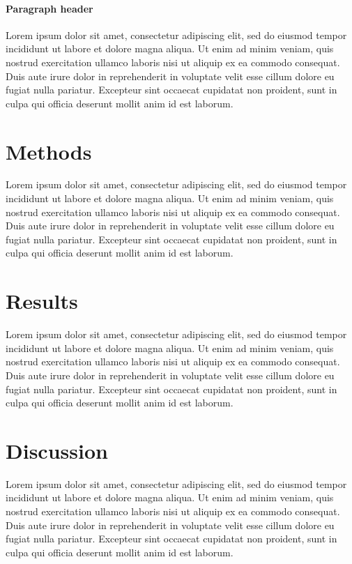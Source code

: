 \documentclass[nogrid]{MBE}%
\begin{document}
\paragraph{Paragraph header} 

Lorem ipsum dolor sit amet, consectetur adipiscing elit, sed do eiusmod tempor incididunt ut labore et dolore magna aliqua. Ut enim ad minim veniam, quis nostrud exercitation ullamco laboris nisi ut aliquip ex ea commodo consequat. Duis aute irure dolor in reprehenderit in voluptate velit esse cillum dolore eu fugiat nulla pariatur. Excepteur sint occaecat cupidatat non proident, sunt in culpa qui officia deserunt mollit anim id est laborum.

\section{{Methods}\label{sec:Methods}}

Lorem ipsum dolor sit amet, consectetur adipiscing elit, sed do eiusmod tempor incididunt ut labore et dolore magna aliqua. Ut enim ad minim veniam, quis nostrud exercitation ullamco laboris nisi ut aliquip ex ea commodo consequat. Duis aute irure dolor in reprehenderit in voluptate velit esse cillum dolore eu fugiat nulla pariatur. Excepteur sint occaecat cupidatat non proident, sunt in culpa qui officia deserunt mollit anim id est laborum.

\section{{Results}\label{sec:Results}}

Lorem ipsum dolor sit amet, consectetur adipiscing elit, sed do eiusmod tempor incididunt ut labore et dolore magna aliqua. Ut enim ad minim veniam, quis nostrud exercitation ullamco laboris nisi ut aliquip ex ea commodo consequat. Duis aute irure dolor in reprehenderit in voluptate velit esse cillum dolore eu fugiat nulla pariatur. Excepteur sint occaecat cupidatat non proident, sunt in culpa qui officia deserunt mollit anim id est laborum.

\section{{Discussion}\label{sec:Discussion}}

Lorem ipsum dolor sit amet, consectetur adipiscing elit, sed do eiusmod tempor incididunt ut labore et dolore magna aliqua. Ut enim ad minim veniam, quis nostrud exercitation ullamco laboris nisi ut aliquip ex ea commodo consequat. Duis aute irure dolor in reprehenderit in voluptate velit esse cillum dolore eu fugiat nulla pariatur. Excepteur sint occaecat cupidatat non proident, sunt in culpa qui officia deserunt mollit anim id est laborum.
\end{document}
